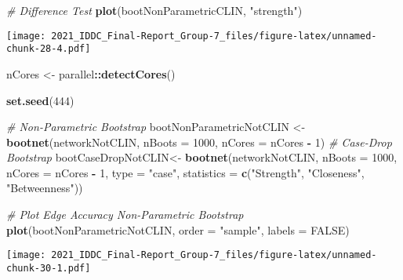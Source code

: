 \documentclass[
]{article}
\newenvironment{Shaded}{\begin{snugshade}}{\end{snugshade}}
\newcommand{\CommentTok}[1]{\textcolor[rgb]{0.56,0.35,0.01}{\textit{#1}}}
\newcommand{\DataTypeTok}[1]{\textcolor[rgb]{0.13,0.29,0.53}{#1}}
\newcommand{\DecValTok}[1]{\textcolor[rgb]{0.00,0.00,0.81}{#1}}
\newcommand{\KeywordTok}[1]{\textcolor[rgb]{0.13,0.29,0.53}{\textbf{#1}}}
\newcommand{\NormalTok}[1]{#1}
\newcommand{\OperatorTok}[1]{\textcolor[rgb]{0.81,0.36,0.00}{\textbf{#1}}}
\newcommand{\OtherTok}[1]{\textcolor[rgb]{0.56,0.35,0.01}{#1}}
\newcommand{\StringTok}[1]{\textcolor[rgb]{0.31,0.60,0.02}{#1}}
\begin{document}
\begin{Shaded}
\begin{Highlighting}[]
\CommentTok{# Difference Test}
\KeywordTok{plot}\NormalTok{(bootNonParametricCLIN, }\StringTok{"strength"}\NormalTok{)}
\end{Highlighting}
\end{Shaded}

\texttt{[image: 2021\_IDDC\_Final-Report\_Group-7\_files/figure-latex/unnamed-chunk-28-4.pdf]}

\begin{Shaded}
\begin{Highlighting}[]
\NormalTok{nCores <-}\StringTok{ }\NormalTok{parallel}\OperatorTok{::}\KeywordTok{detectCores}\NormalTok{()}

\KeywordTok{set.seed}\NormalTok{(}\DecValTok{444}\NormalTok{)}

\CommentTok{# Non-Parametric Bootstrap}
\NormalTok{bootNonParametricNotCLIN <-}\StringTok{ }\KeywordTok{bootnet}\NormalTok{(networkNotCLIN,}
                             \DataTypeTok{nBoots =} \DecValTok{1000}\NormalTok{,}
                             \DataTypeTok{nCores =}\NormalTok{ nCores }\OperatorTok{-}\StringTok{ }\DecValTok{1}\NormalTok{)}
\CommentTok{# Case-Drop Bootstrap}
\NormalTok{bootCaseDropNotCLIN<-}\StringTok{ }\KeywordTok{bootnet}\NormalTok{(networkNotCLIN,}
                        \DataTypeTok{nBoots =} \DecValTok{1000}\NormalTok{,}
                        \DataTypeTok{nCores =}\NormalTok{ nCores }\OperatorTok{-}\StringTok{ }\DecValTok{1}\NormalTok{,}
                        \DataTypeTok{type =} \StringTok{"case"}\NormalTok{,}
                        \DataTypeTok{statistics =} \KeywordTok{c}\NormalTok{(}\StringTok{"Strength"}\NormalTok{, }\StringTok{"Closeness"}\NormalTok{, }\StringTok{"Betweenness"}\NormalTok{))}
\end{Highlighting}
\end{Shaded}

\begin{Shaded}
\begin{Highlighting}[]
\CommentTok{# Plot Edge Accuracy Non-Parametric Bootstrap}
\KeywordTok{plot}\NormalTok{(bootNonParametricNotCLIN,}
     \DataTypeTok{order =} \StringTok{"sample"}\NormalTok{,}
     \DataTypeTok{labels =} \OtherTok{FALSE}\NormalTok{)}
\end{Highlighting}
\end{Shaded}

\texttt{[image: 2021\_IDDC\_Final-Report\_Group-7\_files/figure-latex/unnamed-chunk-30-1.pdf]}
\end{document}
